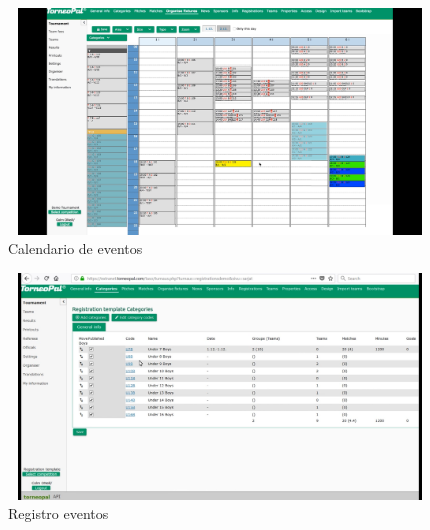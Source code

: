 \begin{figure}[h!]
	\centering
	\includegraphics[width=12cm, height=6cm]{Imagenes/Aplicaciones/TP1.png}
	\caption{Calendario de eventos}
\end{figure}
\begin{figure}[h!]
	\centering
	\includegraphics[width=12cm, height=6cm]{Imagenes/Aplicaciones/TP2.png}
	\caption{Registro eventos}
\end{figure}
\pagebreak

